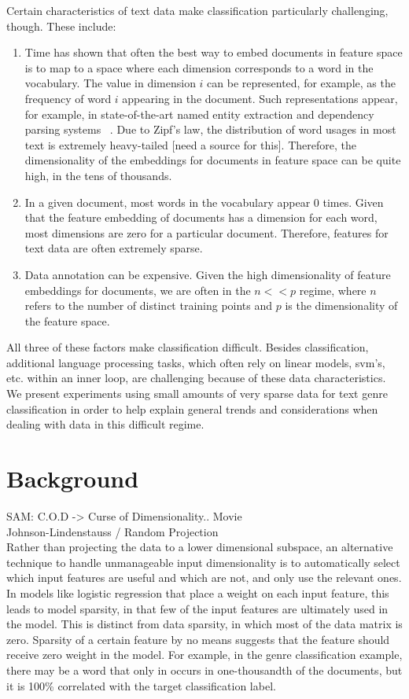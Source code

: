 \documentclass[]{article}
\begin{document}
Certain characteristics of text data make classification particularly challenging, though. These include:
\begin{enumerate}
\item Time has shown that often the best way to embed documents in feature space is to map to a space where each dimension corresponds to a word in the vocabulary. The value in dimension $i$ can be represented, for example, as the frequency of word $i$ appearing in the document. Such representations appear, for example, in state-of-the-art named entity extraction and dependency parsing systems ~\cite{ratinov2009design,nivre2004deterministic}. Due to Zipf's law, the distribution of word usages in most text is extremely heavy-tailed [need a source for this]. Therefore, the dimensionality of the embeddings for documents in feature space can be quite high, in the tens of thousands. 
\item  In a given document, most words in the vocabulary appear 0 times. Given that the feature embedding of documents has a dimension for each word, most dimensions are zero for a particular document. Therefore, features for text data are often extremely sparse. 
\item Data annotation can be expensive. Given the high dimensionality of feature embeddings for documents, we are often in the $n << p$ regime, where $n$ refers to the number of distinct training points and $p$ is the dimensionality of the feature space. 
\end{enumerate}

All three of these factors make classification difficult. Besides classification, additional language processing tasks, which often rely on linear models, svm's, etc. within an inner loop, are challenging because of these data characteristics.  We present experiments  using small amounts of very sparse data for text genre classification in order to help explain general trends and considerations when dealing with data in this difficult regime. 

\section{Background}

SAM: C.O.D -> Curse of Dimensionality.. Movie \\
           Johnson-Lindenstauss / Random Projection \\


	Rather than projecting the data to a lower dimensional subspace, an alternative technique to handle unmanageable input dimensionality is to automatically select which input features are useful and which are not, and only use the relevant ones. In models like logistic regression that place a weight on each input feature, this leads to model sparsity, in that few of the input features are ultimately used in the model. This is distinct from data sparsity, in which most of the data matrix is zero. Sparsity of a certain feature by no means suggests that the feature should receive zero weight in the model. For example, in the genre classification example, there may be a word that only in occurs in one-thousandth of the documents, but it is 100\% correlated with the target classification label. 
\end{document}
